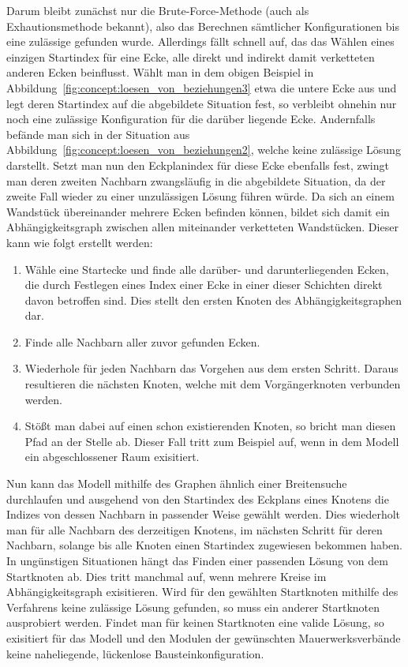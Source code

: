 Darum bleibt zunächst nur die Brute-Force-Methode (auch als Exhautionsmethode bekannt), also das Berechnen sämtlicher Konfigurationen bis eine zulässige gefunden wurde.
Allerdings fällt schnell auf, das das Wählen eines einzigen Startindex für eine Ecke, alle direkt und indirekt damit verketteten anderen Ecken beinflusst.
Wählt man in dem obigen Beispiel in Abbildung~\ref{fig:concept:loesen_von_beziehungen3} etwa die untere Ecke aus und legt deren Startindex auf die abgebildete Situation fest, so verbleibt ohnehin nur noch eine zulässige Konfiguration für die darüber liegende Ecke.
Andernfalls befände man sich in der Situation aus Abbildung~\ref{fig:concept:loesen_von_beziehungen2}, welche keine zulässige Lösung darstellt.
Setzt man nun den Eckplanindex für diese Ecke ebenfalls fest, zwingt man deren zweiten Nachbarn zwangsläufig in die abgebildete Situation, da der zweite Fall wieder zu einer unzulässigen Lösung führen würde.
Da sich an einem Wandstück übereinander mehrere Ecken befinden können, bildet sich damit ein Abhängigkeitsgraph zwischen allen miteinander verketteten Wandstücken.
Dieser kann wie folgt erstellt werden:

\begin{enumerate}
    \item Wähle eine Startecke und finde alle darüber- und darunterliegenden Ecken, die durch Festlegen eines Index einer Ecke in einer dieser Schichten direkt davon betroffen sind. Dies stellt den ersten Knoten des Abhängigkeitsgraphen dar.
    \item Finde alle Nachbarn aller zuvor gefunden Ecken.
    \item Wiederhole für jeden Nachbarn das Vorgehen aus dem ersten Schritt. Daraus resultieren die nächsten Knoten, welche mit dem Vorgängerknoten verbunden werden.
    \item Stößt man dabei auf einen schon existierenden Knoten, so bricht man diesen Pfad an der Stelle ab. Dieser Fall tritt zum Beispiel auf, wenn in dem Modell ein abgeschlossener Raum exisitiert.
\end{enumerate}

Nun kann das Modell mithilfe des Graphen ähnlich einer Breitensuche durchlaufen und ausgehend von den Startindex des Eckplans eines Knotens die Indizes von dessen Nachbarn in passender Weise gewählt werden.
Dies wiederholt man für alle Nachbarn des derzeitigen Knotens, im nächsten Schritt für deren Nachbarn, solange bis alle Knoten einen Startindex zugewiesen bekommen haben.
In ungünstigen Situationen hängt das Finden einer passenden Lösung von dem Startknoten ab.
Dies tritt manchmal auf, wenn mehrere Kreise im Abhängigkeitsgraph exisitieren.
Wird für den gewählten Startknoten mithilfe des Verfahrens keine zulässige Lösung gefunden, so muss ein anderer Startknoten ausprobiert werden.
Findet man für keinen Startknoten eine valide Lösung, so exisitiert für das Modell und den Modulen der gewünschten Mauerwerksverbände keine naheliegende, lückenlose Bausteinkonfiguration.


